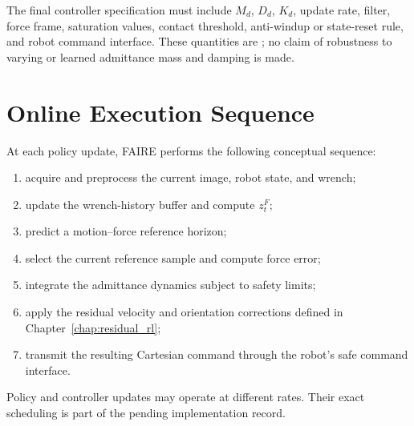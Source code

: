 The final controller specification must include \(M_d\), \(D_d\), \(K_d\), update rate, filter, force frame, saturation values, contact threshold, anti-windup or state-reset rule, and robot command interface. These quantities are ; no claim of robustness to varying or learned admittance mass and damping is made.

\section{Online Execution Sequence}
At each policy update, FAIRE performs the following conceptual sequence:
\begin{enumerate}
  \item acquire and preprocess the current image, robot state, and wrench;
  \item update the wrench-history buffer and compute \(z_t^F\);
  \item predict a motion--force reference horizon;
  \item select the current reference sample and compute force error;
  \item integrate the admittance dynamics subject to safety limits;
  \item apply the residual velocity and orientation corrections defined in Chapter~\ref{chap:residual_rl};
  \item transmit the resulting Cartesian command through the robot's safe command interface.
\end{enumerate}
Policy and controller updates may operate at different rates. Their exact scheduling is part of the pending implementation record.
